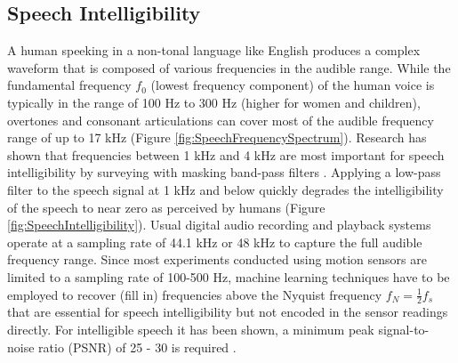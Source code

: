 \documentclass[sigconf, nonacm]{acmart}
\begin{document}
\subsection{Speech Intelligibility}
A human speeking in a non-tonal language like English produces a complex waveform that is composed of various frequencies in the audible range.
While the fundamental frequency $f_0$ (lowest frequency component) of the human voice is typically in the range of 100 Hz to 300 Hz (higher for women and children), overtones and consonant articulations can cover most of the audible frequency range of up to 17 kHz (Figure \ref{fig:SpeechFrequencySpectrum}).
Research has shown that frequencies between 1 kHz and 4 kHz are most important for speech intelligibility by surveying with masking band-pass filters \cite{DPAMicrophonesFactsAboutSpeechIntelligibility}.
Applying a low-pass filter to the speech signal at 1 kHz and below quickly degrades the intelligibility of the speech to near zero as perceived by humans (Figure \ref{fig:SpeechIntelligibility}).
Usual digital audio recording and playback systems operate at a sampling rate of 44.1 kHz or 48 kHz to capture the full audible frequency range.
Since most experiments conducted using motion sensors are limited to a sampling rate of 100-500 Hz, machine learning techniques have to be employed to recover (fill in) frequencies above the Nyquist frequency $f_N = \frac{1}{2}f_s$ that are essential for speech intelligibility but not encoded in the sensor readings directly.
For intelligible speech it has been shown, a minimum peak signal-to-noise ratio (PSNR) of 25 - 30 is required \cite{DPAMicrophonesFactsAboutSpeechIntelligibility}.
\end{document}
